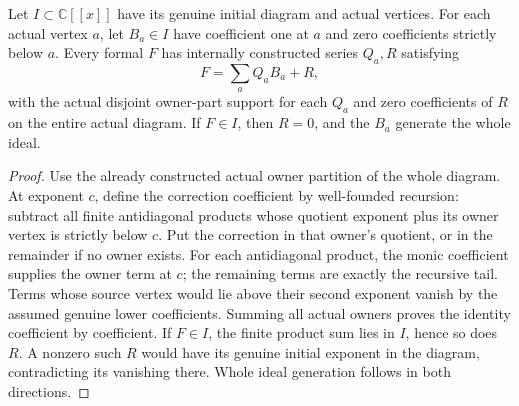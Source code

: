 \begin{theorem}
\label{hir:actual-monic-vertex-family-whole-division}
\leanok
Let $I\subset\mathbb C[[x]]$ have its genuine initial diagram and actual
vertices. For each actual vertex $a$, let $B_a\in I$ have coefficient one
at $a$ and zero coefficients strictly below $a$. Every formal $F$ has
internally constructed series $Q_a,R$ satisfying
\[
 F=\sum_a Q_aB_a+R,
\]
with the actual disjoint owner-part support for each $Q_a$ and zero
coefficients of $R$ on the entire actual diagram. If $F\in I$, then
$R=0$, and the $B_a$ generate the whole ideal.
\end{theorem}
\begin{proof}
Use the already constructed actual owner partition of the whole diagram.
At exponent $c$, define the correction coefficient by well-founded
recursion: subtract all finite antidiagonal products whose quotient
exponent plus its owner vertex is strictly below $c$. Put the correction
in that owner's quotient, or in the remainder if no owner exists.
For each antidiagonal product, the monic coefficient supplies the owner
term at $c$; the remaining terms are exactly the recursive tail. Terms
whose source vertex would lie above their second exponent vanish by the
assumed genuine lower coefficients. Summing all actual owners proves the
identity coefficient by coefficient. If $F\in I$, the finite product sum
lies in $I$, hence so does $R$. A nonzero such $R$ would have its genuine
initial exponent in the diagram, contradicting its vanishing there.
Whole ideal generation follows in both directions.
\end{proof}

